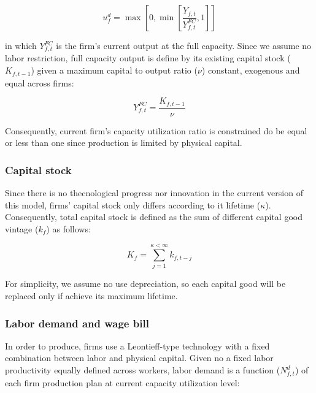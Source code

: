 \documentclass{SelfArx}
\begin{document}
\begin{latex}
\begin{equation}
u^{d}_{f} = \max\left[ 0, \min\left[ \frac{Y_{f,t}}{Y_{f,t}^{FC}}, 1 \right] \right]
\end{equation}
\end{latex}
in which \(Y_{f,t}^{FC}\) is the firm's current output at the full capacity.
Since we assume no labor restriction, full capacity output is define by its existing capital stock (\(K_{f,t-1}\)) given a maximum capital to output ratio (\(\nu\)) constant, exogenous and equal across firms:

\begin{latex}
\begin{equation}
Y_{f,t}^{FC} = \frac{K_{f,t-1}}{\nu}
\end{equation}
\end{latex}
Consequently, current firm's capacity utilization ratio is constrained do be equal or less than one since production is limited by physical capital.



\subsubsection{Capital stock}
\label{sec:org2ad24e8}


Since there is no thecnological progress nor innovation in the current version of this model, firms' capital stock only differs according to it lifetime (\(\kappa\)).
Consequently, total capital stock is defined as the sum of different capital good vintage (\(k_{f}\)) as follows:

\begin{latex}
\begin{equation}
K_{f} = \sum_{j=1}^{\kappa < \infty} k_{f,t-j}
\end{equation}
\end{latex}
For simplicity, we assume no use depreciation, so each capital good will be replaced only if achieve its maximum lifetime.

\subsubsection{Labor demand and wage bill}
\label{sec:orgfa8a7e6}

In order to produce, firms use a Leontieff-type technology with a fixed combination between labor and physical capital.
Given no a fixed labor productivity equally defined across workers, labor demand is a function (\(N^{d}_{f,t}\)) of each firm production plan at current capacity utilization level:
\end{document}
